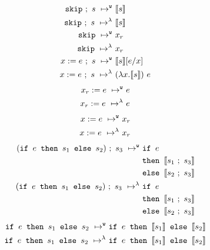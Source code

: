 \documentclass[11pt, leqno, titlepage]{article}
\theoremstyle{definition}
\begin{document}
\begin{align}
  \texttt{skip} ~;~s ~\mapsto^{\texttt{w}}~ & \llbracket s \rrbracket\\
  \texttt{skip} ~;~s ~\mapsto^\lambda~ & \llbracket s \rrbracket\notag
                                         \notag\\
  \texttt{skip}     ~\mapsto^{\texttt{w}}~ & x_r\\
  \texttt{skip}     ~\mapsto^\lambda~ & x_r\notag
                                        \notag\\
  x := e~;~s        ~\mapsto^{\texttt{w}}~ & \llbracket s\rrbracket[e / x]\notag\\
  x := e~;~s        ~\mapsto^\lambda~ & (\lambda x.\llbracket s \rrbracket)~e
\end{align}
\begin{align}
  x_r := e          ~\mapsto^{\texttt{w}}~ & e \\
  x_r := e          ~\mapsto^\lambda~ & e \notag
\end{align}
\begin{align}
  x := e            ~\mapsto^{\texttt{w}}~ & x_r \\
  x := e            ~\mapsto^\lambda~ & x_r \notag
\end{align}
\begin{align}
  (\texttt{if } e \texttt{ then } s_1 \texttt{ else } s_2) ~;~s_3
                    ~\mapsto^{\texttt{w}}~ & \texttt{if } e \\
                    &  \texttt{then } \llbracket s_1 ~;~ s_3 \rrbracket\notag\\
                    & \texttt{else } \llbracket s_2 ~;~ s_3 \rrbracket \notag\\
  (\texttt{if } e \texttt{ then } s_1 \texttt{ else } s_2) ~;~s_3
                    ~\mapsto^\lambda~ &  \texttt{if } e \\
                    &  \texttt{then } \llbracket s_1 ~;~ s_3 \rrbracket\notag\\
                    & \texttt{else } \llbracket s_2 ~;~ s_3 \rrbracket \notag
\end{align}
\begin{align}
  \texttt{if } e \texttt{ then } s_1 \texttt{ else } s_2
                    ~\mapsto^{\texttt{w}}~ & \texttt{if } e
                                  \texttt{ then } \llbracket s_1 \rrbracket
                                  \texttt{ else } \llbracket s_2 \rrbracket \\
  \texttt{if } e \texttt{ then } s_1 \texttt{ else } s_2
                    ~\mapsto^\lambda~ & \texttt{if } e
                                  \texttt{ then } \llbracket s_1 \rrbracket
                                  \texttt{ else } \llbracket s_2 \rrbracket \notag
\end{align}
\end{document}
